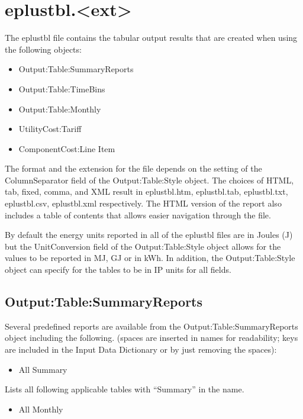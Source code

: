 \section{eplustbl.\textless{}ext\textgreater{}}\label{eplustbl.ext}

The eplustbl file contains the tabular output results that are created when using the following objects:

\begin{itemize}
\item
  Output:Table:SummaryReports
\item
  Output:Table:TimeBins
\item
  Output:Table:Monthly
\item
  UtilityCost:Tariff
\item
  ComponentCost:Line Item
\end{itemize}

The format and the extension for the file depends on the setting of the ColumnSeparator field of the Output:Table:Style object. The choices of HTML, tab, fixed, comma, and XML result in eplustbl.htm, eplustbl.tab, eplustbl.txt, eplustbl.csv, eplustbl.xml respectively. The HTML version of the report also includes a table of contents that allows easier navigation through the file.

By default the energy units reported in all of the eplustbl files are in Joules (J) but the UnitConversion field of the Output:Table:Style object allows for the values to be reported in MJ, GJ or in kWh. In addition, the Output:Table:Style object can specify for the tables to be in IP units for all fields.

\subsection{Output:Table:SummaryReports}\label{outputtablesummaryreports}

Several predefined reports are available from the Output:Table:SummaryReports object including the following. (spaces are inserted in names for readability; keys are included in the Input Data Dictionary or by just removing the spaces):

\begin{itemize}
\tightlist
\item
  All Summary
\end{itemize}

Lists all following applicable tables with ``Summary'' in the name.

\begin{itemize}
\tightlist
\item
  All Monthly
\end{itemize}

